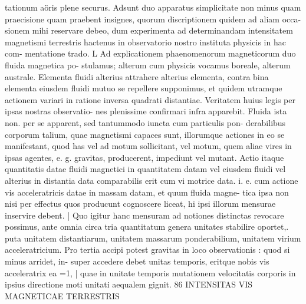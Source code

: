 \documentclass[12pt,a4paper]{article}
\begin{document}
tationum aöris plene securus. Adsunt duo apparatus simplicitate non minus quam
praecisione quam praebent insignes, quorum discriptionem quidem ad aliam occa-
sionem mihi reservare debeo, dum experimenta ad determinandam intensitatem
magnetismi terrestris hactenus in observatorio nostro instituta physicis in hac com-
mentatione trado.
L
Ad explicationem phaenomenorum magneticorum duo fluida magnetica po-
stulamus; alterum cum physicis vocamus boreale, alterum australe. Elementa
fluidi alterius attrahere alterius elementa,    contra bina elementa eiusdem fluidi
mutuo se repellere supponimus, et quidem utramque actionem variari in ratione
inversa quadrati distantiae. Veritatem huius legis per ipsas nostras observatio-
nes plenissime confirmari infra apparebit.
Fluida ista non. per se apparent, sed tantummodo iuncta cum particulis pon-
derabilibus corporum talium, quae magnetismi capaces sunt, illorumque actiones
in eo se manifestant,   quod has vel ad motum    sollicitant,   vel motum,   quem aliae
vires in ipsas agentes, e. g. gravitas, producerent, impediunt vel mutant.
Actio itaque quantitatis datae fluidi magnetici in quantitatem datam vel
eiusdem fluidi vel alterius in distantia data comparabilis erit cum vi motrice data.
i. e. cum actione vis acceleratricis datae in massam datam, et quum fluida magne-
tica ipsa non nisi per effectus quos producunt cognoscere liceat, hi ipsi illorum
mensurae inservire debent.               |
Quo igitur hanc mensuram ad notiones distinctas revocare possimus, ante
omnia circa tria quantitatum genera unitates stabilire oportet,. puta unitatem
distantiarum, unitatem massarum ponderabilium, unitatem virium acceleratricium.
Pro tertia accipi potest gravitas in loco observationis : quod si minus arridet, in-
super accedere debet unitas temporis, eritque nobis vis acceleratrix ea =1,
| quae in unitate temporis mutationem velocitatis corporis in ipsius directione moti
unitati aequalem gignit.
86                              INTENSITAS   VIS    MAGNETICAE   TERRESTRIS
\end{document}

